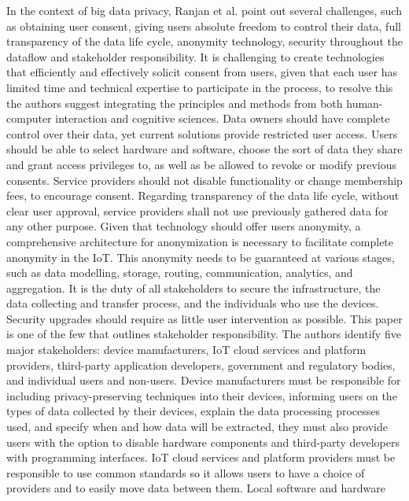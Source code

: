 In the context of big data privacy, Ranjan et al. \cite{perera2015big} point
out several challenges, such as obtaining user consent, giving users absolute
freedom to control their data, full transparency of the data life cycle, anonymity
technology, security throughout the dataflow and stakeholder responsibility.
It is challenging to create technologies that efficiently and effectively solicit
consent from users, given that each user has limited time and technical expertise
to participate in the process, to resolve this the authors suggest
integrating the principles and methods from both human-computer interaction and
cognitive sciences. Data owners should have complete control over their data,
yet current solutions provide restricted user access. Users should be able to
select hardware and software, choose the sort of data they share and grant access
privileges to, as well as be allowed to revoke or modify previous consents.
Service providers should not disable functionality or change membership fees,
to encourage consent. Regarding transparency of the data life cycle, without
clear user approval, service providers shall not use previously gathered data
for any other purpose. Given that technology should offer users anonymity, a
comprehensive architecture for anonymization is necessary to facilitate complete
anonymity in the IoT. This anonymity needs to be guaranteed at various stages,
such as data modelling, storage, routing, communication, analytics, and aggregation.
It is the duty of all stakeholders to secure the infrastructure, the data collecting
and transfer process, and the individuals who use the devices. Security upgrades
should require as little user intervention as possible.
This paper is one of the few that outlines stakeholder responsibility. The
authors identify five major stakeholders: device manufacturers, IoT cloud services
and platform providers, third-party application developers, government and regulatory
bodies, and individual users and non-users. Device manufacturers must be responsible
for including privacy-preserving techniques into their devices, informing users
on the types of data collected by their devices, explain the data processing
processes used, and specify when and how data will be extracted, they must also
provide users with the option to disable hardware components and third-party
developers with programming interfaces. IoT cloud services and platform providers
must be responsible to use common standards so it allows users to have a choice
of providers and to easily move data between them. Local software and hardware
